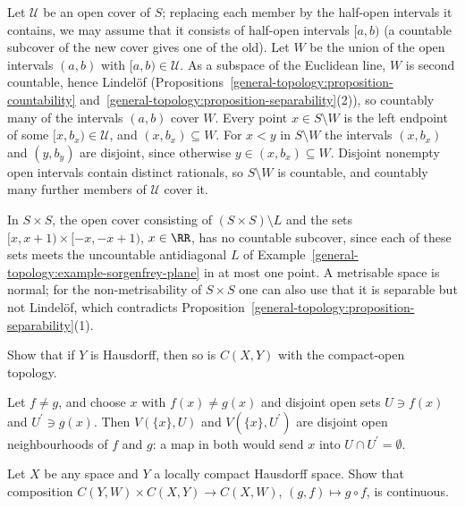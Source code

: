 \begin{solution}
Let $\mathcal{U}$ be an open cover of $S$; replacing each member by the half-open intervals it contains, we may assume that it consists of half-open intervals $[a, b)$ (a countable subcover of
the new cover gives one of the old). Let $W$ be the union of the open intervals $(a, b)$ with $[a, b) \in \mathcal{U}$. As a subspace of the
Euclidean line, $W$ is second countable, hence Lindel\"of (Propositions~\ref{general-topology:proposition-countability} and~\ref{general-topology:proposition-separability}(2)), so countably many of the
intervals $(a, b)$ cover $W$. Every point $x \in S \setminus W$ is the left endpoint of some $[x, b_x) \in \mathcal{U}$, and $(x, b_x) \subseteq W$. For $x < y$ in $S \setminus W$ the intervals $(x, b_x)$ and
$(y, b_y)$ are disjoint, since otherwise $y \in (x, b_x) \subseteq W$. Disjoint nonempty open intervals contain distinct rationals, so $S \setminus W$ is countable, and countably many further members of
$\mathcal{U}$ cover it.

In $S \times S$, the open cover consisting of $(S \times S) \setminus L$ and the sets $[x, x + 1) \times [-x, -x + 1)$, $x \in \RR$, has no countable subcover, since each of these sets meets the uncountable antidiagonal
$L$ of Example~\ref{general-topology:example-sorgenfrey-plane} in at most one point. A metrisable space is normal; for the non-metrisability of $S \times S$ one can also use that it is separable but not Lindel\"of,
which contradicts Proposition~\ref{general-topology:proposition-separability}(1).
\end{solution}

\begin{exercise}\label{general-topology:exercise-compact-open-hausdorff}
Show that if $Y$ is Hausdorff, then so is $C(X, Y)$ with the compact-open topology.
\end{exercise}

\begin{solution}
Let $f \neq g$, and choose $x$ with $f(x) \neq g(x)$ and disjoint open sets $U \ni f(x)$ and $U^{\prime} \ni g(x)$. Then $V(\{x\}, U)$ and $V(\{x\}, U^{\prime})$ are disjoint open neighbourhoods of
$f$ and $g$: a map in both would send $x$ into $U \cap U^{\prime} = \emptyset$.
\end{solution}

\begin{exercise}\label{general-topology:exercise-composition}
Let $X$ be any space and $Y$ a locally compact Hausdorff space. Show that composition $C(Y, W) \times C(X, Y) \to C(X, W)$, $(g, f) \mapsto g \circ f$, is continuous.
\end{exercise}

